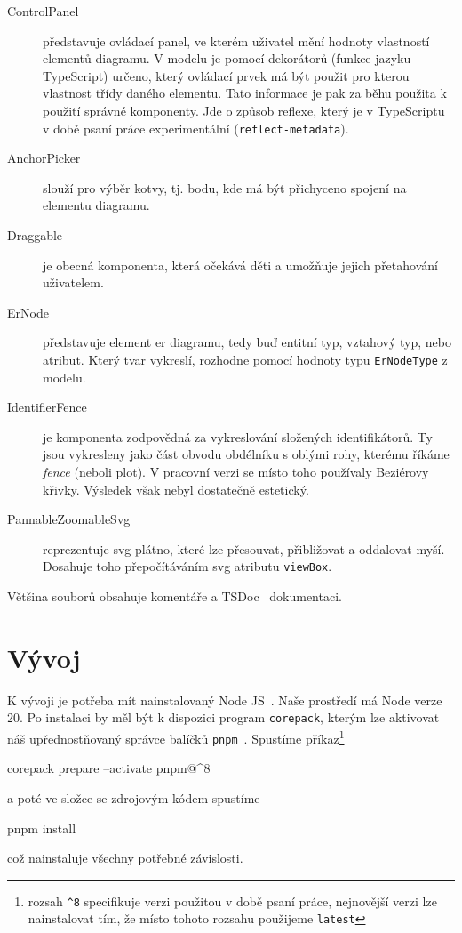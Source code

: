 \begin{description}
  \item[ControlPanel] představuje ovládací panel, ve kterém uživatel mění hodnoty vlastností elementů diagramu.
    V modelu je pomocí dekorátorů (funkce jazyku TypeScript) určeno, který ovládací prvek má být použit pro kterou vlastnost třídy daného elementu.
    Tato informace je pak za běhu použita k použití správné komponenty.
    Jde o způsob reflexe, který je v TypeScriptu v době psaní práce experimentální (\texttt{reflect-metadata}).
  \item[AnchorPicker] slouží pro výběr kotvy, tj. bodu, kde má být přichyceno spojení na elementu diagramu.
  \item[Draggable] je obecná komponenta, která očekává děti a umožňuje jejich přetahování uživatelem.
  \item[ErNode] představuje element \acrshort{er} diagramu, tedy buď entitní typ, vztahový typ, nebo atribut.
    Který tvar vykreslí, rozhodne pomocí hodnoty typu \texttt{ErNodeType} z modelu.
  \item[IdentifierFence] je komponenta zodpovědná za vykreslování složených identifikátorů.
    Ty jsou vykresleny jako část obvodu obdélníku s oblými rohy, kterému říkáme \emph{fence} (neboli plot).
    V pracovní verzi se místo toho používaly Beziérovy křivky.
    Výsledek však nebyl dostatečně estetický.
  \item[PannableZoomableSvg] reprezentuje \acrshort{svg} plátno, které lze přesouvat, přibližovat a oddalovat myší.
    Dosahuje toho přepočítáváním \acrshort{svg} atributu \texttt{viewBox}.
\end{description}

Většina souborů obsahuje komentáře a TSDoc~\cite{microsoft_whattsdoc_2023} dokumentaci.

\section{Vývoj}\label{section:development}

K vývoji je potřeba mít nainstalovaný Node JS~\cite{openjsfoundation_nodejs_2023}.
Naše prostředí má Node verze 20.
Po instalaci by měl být k dispozici program \texttt{corepack}, kterým lze aktivovat náš upřednostňovaný správce balíčků \texttt{pnpm}~\cite{pnpm_pnpmfast_2023}.
Spustíme příkaz\footnote{rozsah \texttt{\^{}8} specifikuje verzi použitou v době psaní práce, nejnovější verzi lze nainstalovat tím, že místo tohoto rozsahu použijeme \texttt{latest}}
\begin{command}
corepack prepare --activate pnpm@^8
\end{command}
a poté ve složce  se zdrojovým kódem spustíme
\begin{command}
pnpm install
\end{command}
což nainstaluje všechny potřebné závislosti.

